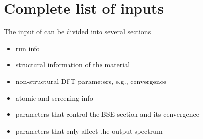 \documentclass[11pt]{report}
\begin{document}
\section{Complete list of  inputs}

The input of  can be divided into several sections

\begin{itemize}
\item run info
\item structural information of the material
\item non-structural DFT parameters, e.g., convergence
\item atomic and screening info
\item parameters that control the BSE section and its convergence
\item parameters that only affect the output spectrum
\end{itemize}
\end{document}
